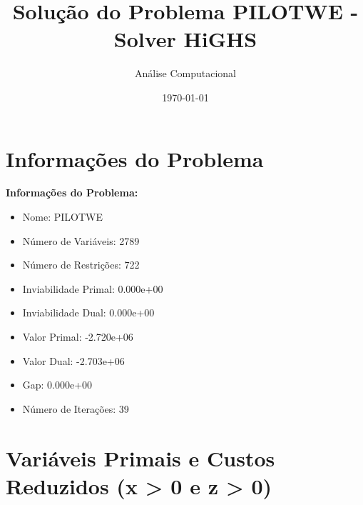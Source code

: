 \documentclass[12pt]{article}
\title{Solução do Problema PILOTWE - Solver HiGHS}
\author{Análise Computacional}
\date{\today}
\begin{document}
\maketitle

\section{Informações do Problema}

\textbf{Informações do Problema:}
\begin{itemize}
\item Nome: PILOTWE
\item Número de Variáveis: 2789
\item Número de Restrições: 722
\item Inviabilidade Primal: 0.000e+00
\item Inviabilidade Dual: 0.000e+00
\item Valor Primal: -2.720e+06
\item Valor Dual: -2.703e+06
\item Gap: 0.000e+00
\item Número de Iterações: 39
\end{itemize}


\section{Variáveis Primais e Custos Reduzidos (x > 0 e z > 0)}
\end{document}
